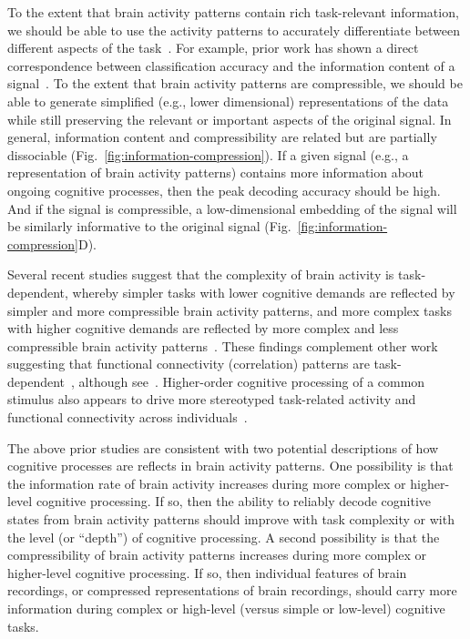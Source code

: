\documentclass[english]{article}
\begin{document}
To the extent that brain activity patterns contain rich task-relevant
information, we should be able to use the activity patterns to accurately
differentiate between different aspects of the task~\citep[e.g., using pattern
classifiers;][]{NormEtal06b}. For example, prior work has shown a direct
correspondence between classification accuracy and the information content of a
signal~\citep{Alva02}. To the extent that brain activity patterns are
compressible, we should be able to generate simplified (e.g., lower
dimensional) representations of the data while still preserving the relevant or
important aspects of the original signal. In general, information content and
compressibility are related but are partially dissociable
(Fig.~\ref{fig:information-compression}). If a given signal (e.g., a
representation of brain activity patterns) contains more information about
ongoing cognitive processes, then the peak decoding accuracy should be high.
And if the signal is compressible, a low-dimensional embedding of the signal
will be similarly informative to the original signal
(Fig.~\ref{fig:information-compression}D).


Several recent studies suggest that the complexity of brain activity is
task-dependent, whereby simpler tasks with lower cognitive demands are
reflected by simpler and more compressible brain activity patterns, and more
complex tasks with higher cognitive demands are reflected by more complex and
less compressible brain activity patterns~\citep{MackEtal20, OwenEtal21}. These
findings complement other work suggesting that functional connectivity
(correlation) patterns are task-dependent~\citep{FinnEtal17, OwenEtal20,
ColeEtal14}, although see~\cite{GratEtal18}. Higher-order cognitive processing
of a common stimulus also appears to drive more stereotyped task-related
activity and functional connectivity across individuals~\citep{HassEtal08,
LernEtal11, SimoChan20, SimoEtal16}.

The above prior studies are consistent with two potential descriptions of how
cognitive processes are reflects in brain activity patterns. One possibility is
that the information rate of brain activity increases during more complex or
higher-level cognitive processing. If so, then the ability to reliably decode
cognitive states from brain activity patterns should improve with task
complexity or with the level (or ``depth'') of cognitive processing. A second
possibility is that the compressibility of brain activity patterns increases
during more complex or higher-level cognitive processing. If so, then
individual features of brain recordings, or compressed representations of brain
recordings, should carry more information during complex or high-level (versus
simple or low-level) cognitive tasks.
\end{document}
